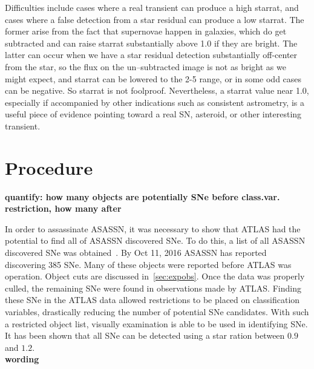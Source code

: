 \documentclass[aps,prb,twocolumn,superscriptaddress]{revtex4-1}
\begin{document}
Difficulties include cases where a real transient can produce a high 
starrat, and cases where a false detection from a star residual can 
produce a low starrat. The former arise from the fact that supernovae 
happen in galaxies, which do get subtracted and can raise starrat 
substantially above 1.0 if they are bright. The latter can occur when 
we have a star residual detection substantially off-center from the 
star, so the flux on the un--subtracted image is not as bright as we might 
expect, and starrat can be lowered to the 2-5 range, or in some odd 
cases can be negative. So starrat is not foolproof. Nevertheless, a 
starrat value near 1.0, especially if accompanied by other indications 
such as consistent astrometry, is a useful piece of evidence pointing 
toward a real SN, asteroid, or other interesting transient.






\section{Procedure}
{\bf quantify: how many objects are potentially SNe before class.var. restriction, how many after\\
}

\indent In order to assassinate ASASSN, 
it was necessary to show that ATLAS had the potential to find all of ASASSN discovered SNe. 
To do this, a list of all ASASSN discovered SNe was obtained~\cite{asn_data}. 
By Oct 11, 2016 
ASASSN has reported discovering 385 SNe. Many of these 
objects were reported before ATLAS was operation. Object cuts are discussed 
in~\cref{sec:expobs}. Once the data was properly culled, the remaining SNe 
were found in observations made by ATLAS. 
Finding these SNe in the ATLAS 
data allowed restrictions to be placed on classification variables, drastically 
reducing the number of potential SNe candidates. With such a restricted object 
list, visually examination is able to be used in identifying SNe.  It has been 
shown that all SNe can be detected using a star ration between $0.9$ and $1.2$.\\{\bf wording} 
\end{document}
